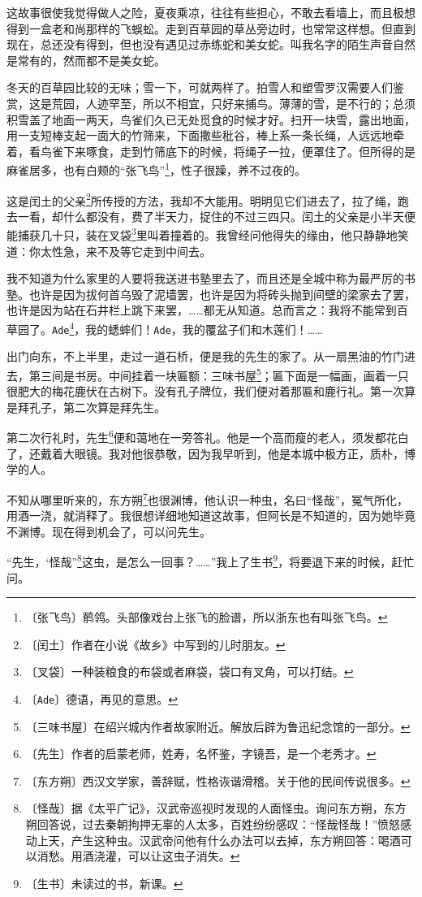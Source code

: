 \documentclass[12pt,UTF-8,openany]{ctexbook}
\begin{document}
\begin{large}
    这故事很使我觉得做人之险，夏夜乘凉，往往有些担心，不敢去看墙上，而且极想得到一盒老和尚那样的飞蜈蚣。走到百草园的草丛旁边时，也常常这样想。但直到现在，总还没有得到，但也没有遇见过赤练蛇和美女蛇。叫我名字的陌生声音自然是常有的，然而都不是美女蛇。
    
    冬天的百草园比较的无味；雪一下，可就两样了。拍雪人和塑雪罗汉需要人们鉴赏，这是荒园，人迹罕至，所以不相宜，只好来捕鸟。薄薄的雪，是不行的；总须积雪盖了地面一两天，鸟雀们久已无处觅食的时候才好。扫开一块雪，露出地面，用一支短棒支起一面大的竹筛来，下面撒些秕谷，棒上系一条长绳，人远远地牵着，看鸟雀下来啄食，走到竹筛底下的时候，将绳子一拉，便罩住了。但所得的是麻雀居多，也有白颊的“张飞鸟”\footnote{〔张飞鸟〕鹡鸰。头部像戏台上张飞的脸谱，所以浙东也有叫张飞鸟。}，性子很躁，养不过夜的。
    
    这是闰土的父亲\footnote{〔闰土〕作者在小说《故乡》中写到的儿时朋友。}所传授的方法，我却不大能用。明明见它们进去了，拉了绳，跑去一看，却什么都没有，费了半天力，捉住的不过三四只。闰土的父亲是小半天便能捕获几十只，装在叉袋\footnote{〔叉袋〕一种装粮食的布袋或者麻袋，袋口有叉角，可以打结。}里叫着撞着的。我曾经问他得失的缘由，他只静静地笑道：你太性急，来不及等它走到中间去。
    
    我不知道为什么家里的人要将我送进书塾里去了，而且还是全城中称为最严厉的书塾。也许是因为拔何首乌毁了泥墙罢，也许是因为将砖头抛到间壁的梁家去了罢，也许是因为站在石井栏上跳下来罢，……都无从知道。总而言之：我将不能常到百草园了。\texttt{Ade}\footnote{〔\texttt{Ade}〕德语，再见的意思。}，我的蟋蟀们！\texttt{Ade}，我的覆盆子们和木莲们！……
    
    出门向东，不上半里，走过一道石桥，便是我的先生的家了。从一扇黑油的竹门进去，第三间是书房。中间挂着一块匾额：三味书屋\footnote{〔三味书屋〕在绍兴城内作者故家附近。解放后辟为鲁迅纪念馆的一部分。}；匾下面是一幅画，画着一只很肥大的梅花鹿伏在古树下。没有孔子牌位，我们便对着那匾和鹿行礼。第一次算是拜孔子，第二次算是拜先生。
    
    第二次行礼时，先生\footnote{〔先生〕作者的启蒙老师，姓寿，名怀鉴，字镜吾，是一个老秀才。}便和蔼地在一旁答礼。他是一个高而瘦的老人，须发都花白了，还戴着大眼镜。我对他很恭敬，因为我早听到，他是本城中极方正，质朴，博学的人。
    
    不知从哪里听来的，东方朔\footnote{〔东方朔〕西汉文学家，善辞赋，性格诙谐滑稽。关于他的民间传说很多。}也很渊博，他认识一种虫，名曰“怪哉”，冤气所化，用酒一浇，就消释了。我很想详细地知道这故事，但阿长是不知道的，因为她毕竟不渊博。现在得到机会了，可以问先生。
    
    “先生，‘怪哉”\footnote{〔怪哉〕据《太平广记》，汉武帝巡视时发现的人面怪虫。询问东方朔，东方朔回答说，过去秦朝拘押无辜的人太多，百姓纷纷感叹：“怪哉怪哉！”愤怒感动上天，产生这种虫。汉武帝问他有什么办法可以去掉，东方朔回答：喝酒可以消愁。用酒浇灌，可以让这虫子消失。}这虫，是怎么一回事？……”我上了生书\footnote{〔生书〕未读过的书，新课。}，将要退下来的时候，赶忙问。
    

\end{large}
\end{document}
